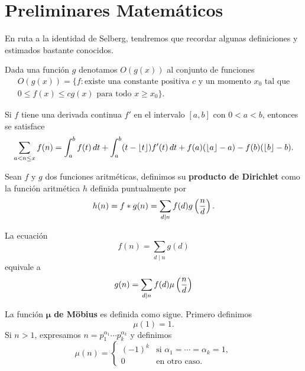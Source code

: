 \setlength{\headheight}{14.61858pt}
\pagestyle{fancy}

\chapter[Preliminares Matem\'aticos]
{Preliminares Matem\'aticos}
\label{ch:preliminaries}

En ruta a la identidad de Selberg,
tendremos que recordar algunas definiciones y estimados bastante conocidos.

Dada una funci\'on \(g\) denotamos \(O(g(x))\) al conjunto de funciones
\[
  \begin{gathered}
    O(g(x)) = \{f : \text{existe una constante positiva } c \text{ y un momento } x_0 \text{ tal que} \\
    0 \leq f(x) \leq cg(x) \text{ para todo } x \geq x_0\}.
  \end{gathered}
\]

\begin{theorem}
\label{thm:euler}
Si \(f\) tiene una derivada continua \(f'\) en el intervalo \([a, b]\)
con \(0 < a < b\), entonces se satisface
\[
  \sum_{a < n \leq x} f(n) = \int_a^b f(t) \, dt +
  \int_a^b (t - \left\lfloor t \right\rfloor) f'(t) \, dt +
  f(a)(\left\lfloor a \right\rfloor - a) - f(b)(\left\lfloor b \right\rfloor - b).
\]
\end{theorem}

Sean \(f\) y \(g\) dos funciones aritm\'eticas, 
definimos su \textbf{producto de Dirichlet} como la funci\'on aritm\'etica
\(h\) definida puntualmente por 
\[
  h(n)
  = f * g(n)
  = \sum_{d \mid n} f(d) g \left( \frac{n}{d} \right).
\]

\begin{theorem}
  \label{thm:mobius}
  La ecuaci\'on
  \[
    f(n) = \sum_{d \mid n} g(d)  
  \]
  equivale a
  \[
    g(n) = \sum_{d \mid n} f(d) \mu \left( \frac{n}{d} \right)  
  \]
\end{theorem}

La funci\'on \(\boldsymbol{\mu}\) \textbf{de M\"{o}bius} es definida como sigue. 
Primero definimos 
\[
  \mu(1) = 1.
\]
Si \(n > 1\),
expresamos \(n = p_1^{\alpha_1} \cdots p_k^{\alpha_k}\) y definimos
\[
  \mu(n) = 
  \begin{cases}
    (-1)^k &\text{si } \alpha_1 = \cdots = \alpha_k = 1, \\
    0 &\text{en otro caso}. 
  \end{cases}
\]

